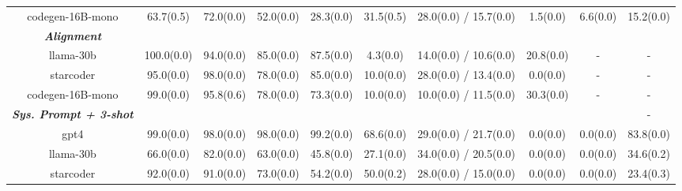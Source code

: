 \begin{table}[]
\begin{adjustbox}{max width=\textwidth}
\begin{tabular}{@{}cccccccccc@{}}
codegen-16B-mono                              & 63.7(0.5)            & 72.0(0.0)            & 52.0(0.0)            & 28.3(0.0)            & 31.5(0.5)            & 28.0(0.0) / 15.7(0.0) & 1.5(0.0)             & 6.6(0.0)             & 15.2(0.0)            \\
\cmidrule(lr){1-10}
\textit{\textbf{Alignment}}                   & \multicolumn{1}{l}{} & \multicolumn{1}{l}{} & \multicolumn{1}{l}{} & \multicolumn{1}{l}{} & \multicolumn{1}{l}{} & \multicolumn{1}{l}{}  & \multicolumn{1}{l}{} & \multicolumn{1}{l}{} & \multicolumn{1}{l}{} \\
llama-30b                                     & 100.0(0.0)           & 94.0(0.0)            & 85.0(0.0)            & 87.5(0.0)            & 4.3(0.0)             & 14.0(0.0) / 10.6(0.0) & 20.8(0.0)            & -                    & -                    \\
starcoder                                     & 95.0(0.0)            & 98.0(0.0)            & 78.0(0.0)            & 85.0(0.0)            & 10.0(0.0)            & 28.0(0.0) / 13.4(0.0) & 0.0(0.0)             & -                    & -                    \\
codegen-16B-mono                              & 99.0(0.0)            & 95.8(0.6)            & 78.0(0.0)            & 73.3(0.0)            & 10.0(0.0)            & 10.0(0.0) / 11.5(0.0) & 30.3(0.0)            & -                    & -                    \\
\cmidrule(lr){1-10}
\textit{\textbf{Sys. Prompt + 3-shot}}        & \multicolumn{1}{l}{} & \multicolumn{1}{l}{} & \multicolumn{1}{l}{} & \multicolumn{1}{l}{} & \multicolumn{1}{l}{} & \multicolumn{1}{l}{}  & \multicolumn{1}{l}{} & \multicolumn{1}{l}{} & -                    \\
gpt4                                          & 99.0(0.0)            & 98.0(0.0)            & 98.0(0.0)            & 99.2(0.0)            & 68.6(0.0)            & 29.0(0.0) / 21.7(0.0) & 0.0(0.0)             & 0.0(0.0)             & 83.8(0.0)            \\
llama-30b                                     & 66.0(0.0)            & 82.0(0.0)            & 63.0(0.0)            & 45.8(0.0)            & 27.1(0.0)            & 34.0(0.0) / 20.5(0.0) & 0.0(0.0)             & 0.0(0.0)             & 34.6(0.2)            \\
starcoder                                     & 92.0(0.0)            & 91.0(0.0)            & 73.0(0.0)            & 54.2(0.0)            & 50.0(0.2)            & 28.0(0.0) / 15.0(0.0) & 0.0(0.0)             & 0.0(0.0)             & 23.4(0.3)            \\

\end{tabular}
\end{adjustbox}
\end{table}
